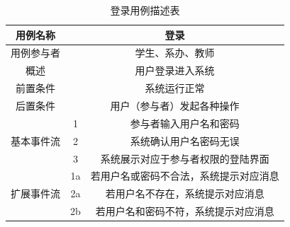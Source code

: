 \documentclass[12pt, a4paper, oneside]{ctexart}
\begin{document}
\begin{table}[H]
    \centering
    \begin{tabular}{|c|cc|}
        \hline
        用例名称                   & \multicolumn{2}{c|}{登录}                       \\ \hline
        用例参与者                  & \multicolumn{2}{c|}{学生、系办、教师}                 \\ \hline
        概述                     & \multicolumn{2}{c|}{用户登录进入系统}                 \\ \hline
        前置条件                   & \multicolumn{2}{c|}{系统运行正常}                   \\ \hline
        后置条件                   & \multicolumn{2}{c|}{用户（参与者）发起各种操作}            \\ \hline
        \multirow{3}{*}{基本事件流} & \multicolumn{1}{c|}{1}  & 参与者输入用户名和密码         \\ \cline{2-3} 
                            & \multicolumn{1}{c|}{2}  & 系统确认用户名密码无误         \\ \cline{2-3} 
                            & \multicolumn{1}{c|}{3}  & 系统展示对应于参与者权限的登陆界面   \\ \hline
        \multirow{3}{*}{扩展事件流} & \multicolumn{1}{c|}{1a} & 若用户名或密码不合法，系统提示对应消息 \\ \cline{2-3} 
                            & \multicolumn{1}{c|}{2a} & 若用户名不存在，系统提示对应消息    \\ \cline{2-3} 
                            & \multicolumn{1}{c|}{2b} & 若用户名和密码不符，系统提示对应消息  \\ \hline
    \end{tabular}
    \caption{登录用例描述表}
\end{table}
\end{document}
